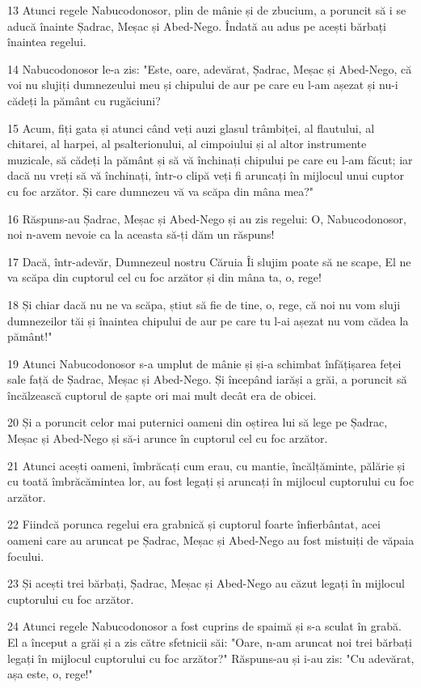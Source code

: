 \par 13 Atunci regele Nabucodonosor, plin de mânie și de zbucium, a poruncit să i se aducă înainte Șadrac, Meșac și Abed-Nego. Îndată au adus pe acești bărbați înaintea regelui.
\par 14 Nabucodonosor le-a zis: "Este, oare, adevărat, Șadrac, Meșac și Abed-Nego, că voi nu slujiți dumnezeului meu și chipului de aur pe care eu l-am așezat și nu-i cădeți la pământ cu rugăciuni?
\par 15 Acum, fiți gata și atunci când veți auzi glasul trâmbiței, al flautului, al chitarei, al harpei, al psalterionului, al cimpoiului și al altor instrumente muzicale, să cădeți la pământ și să vă închinați chipului pe care eu l-am făcut; iar dacă nu vreți să vă închinați, într-o clipă veți fi aruncați în mijlocul unui cuptor cu foc arzător. Și care dumnezeu vă va scăpa din mâna mea?"
\par 16 Răspuns-au Șadrac, Meșac și Abed-Nego și au zis regelui: O, Nabucodonosor, noi n-avem nevoie ca la aceasta să-ți dăm un răspuns!
\par 17 Dacă, într-adevăr, Dumnezeul nostru Căruia Îi slujim poate să ne scape, El ne va scăpa din cuptorul cel cu foc arzător și din mâna ta, o, rege!
\par 18 Și chiar dacă nu ne va scăpa, știut să fie de tine, o, rege, că noi nu vom sluji dumnezeilor tăi și înaintea chipului de aur pe care tu l-ai așezat nu vom cădea la pământ!"
\par 19 Atunci Nabucodonosor s-a umplut de mânie și și-a schimbat înfățișarea feței sale față de Șadrac, Meșac și Abed-Nego. Și începând iarăși a grăi, a poruncit să încălzească cuptorul de șapte ori mai mult decât era de obicei.
\par 20 Și a poruncit celor mai puternici oameni din oștirea lui să lege pe Șadrac, Meșac și Abed-Nego și să-i arunce în cuptorul cel cu foc arzător.
\par 21 Atunci acești oameni, îmbrăcați cum erau, cu mantie, încălțăminte, pălărie și cu toată îmbrăcămintea lor, au fost legați și aruncați în mijlocul cuptorului cu foc arzător.
\par 22 Fiindcă porunca regelui era grabnică și cuptorul foarte înfierbântat, acei oameni care au aruncat pe Șadrac, Meșac și Abed-Nego au fost mistuiți de văpaia focului.
\par 23 Și acești trei bărbați, Șadrac, Meșac și Abed-Nego au căzut legați în mijlocul cuptorului cu foc arzător.
\par 24 Atunci regele Nabucodonosor a fost cuprins de spaimă și s-a sculat în grabă. El a început a grăi și a zis către sfetnicii săi: "Oare, n-am aruncat noi trei bărbați legați în mijlocul cuptorului cu foc arzător?" Răspuns-au și i-au zis: "Cu adevărat, așa este, o, rege!"
